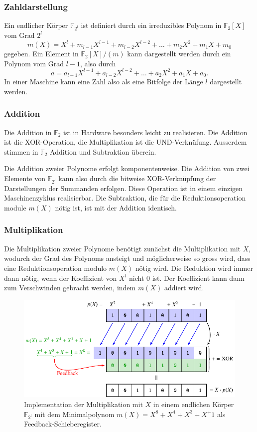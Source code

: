 \subsubsection{Zahldarstellung}
Ein endlicher Körper $\mathbb{F}_{2^l}$ ist definiert durch ein
irreduzibles Polynom in $\mathbb{F}_2[X]$ vom Grad $2^l$ 
\[
m(X)
=
X^l + m_{l-1}X^{l-1} + m_{l-2}X^{l-2} + \dots + m_2X^2 + m_1X + m_0
\]
gegeben.
Ein Element in $\mathbb{F}_2[X]/(m)$ kann dargestellt werden durch ein
Polynom vom Grad $l-1$, also durch
\[
a = a_{l-1}X^{l-1} + a_{l-2}X^{l-2} +\dots + a_2X^2 + a_1X + a_0.
\]
In einer Maschine kann eine Zahl also als eine Bitfolge der Länge $l$
dargestellt werden.

\subsubsection{Addition}
Die Addition in $\mathbb{F}_2$ ist in Hardware besonders leicht zu
realisieren.
Die Addition ist die XOR-Operation, die Multiplikation ist die UND-Verknüfung.
Ausserdem stimmen in $\mathbb{F}_2$ Addition und Subtraktion überein.

Die Addition zweier Polynome erfolgt komponentenweise.
Die Addition von zwei Elemente von $\mathbb{F}_{2^l}$ kann also
durch die bitweise XOR-Verknüpfung der Darstellungen der Summanden 
erfolgen.
Diese Operation ist in einem einzigen Maschinenzyklus realisierbar.
Die Subtraktion, die für die Reduktionsoperation module $m(X)$ nötig
ist, ist mit der Addition identisch.

\subsubsection{Multiplikation}
Die Multiplikation zweier Polynome benötigt zunächst die Multiplikation
mit $X$, wodurch der Grad des Polynoms ansteigt und möglicherweise so
gross wird, dass eine Reduktionsoperation modulo $m(X)$ nötig wird.
Die Reduktion wird immer dann nötig, wenn der Koeffizient von $X^l$
nicht $0$ ist.
Der Koeffizient kann dann zum Verschwinden gebracht werden, indem
$m(X)$ addiert wird.

\begin{figure}
\centering
\includegraphics{chapters/90-crypto/images/schieberegister.pdf}
\caption{Implementation der Multiplikation mit $X$ in einem 
endlichen Körper $\mathbb{F}_{2^l}$ mit dem Minimalpolynom
$m(X) = X^8+X^4+X^3+X^+1$ als Feedback-Schieberegister.
\label{buch:crypto:fig:schieberegister}}
\end{figure}


